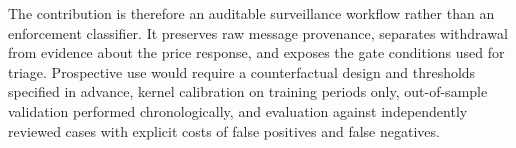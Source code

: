\documentclass[11pt]{article}
\newenvironment{review}{\begingroup\color{blue}}{\endgroup}
\begin{document}
The contribution is therefore an auditable surveillance workflow rather than an enforcement classifier. It preserves raw
message provenance, separates withdrawal from \begin{review}evidence about the price response\end{review}, and exposes the gate conditions used for triage.
Prospective use would require \begin{review}a counterfactual design and thresholds specified in advance\end{review}, kernel calibration on training periods
only, \begin{review}out-of-sample validation performed chronologically\end{review}, and evaluation against independently reviewed cases with explicit
\begin{review}costs of false positives and false negatives\end{review}.


\end{document}
